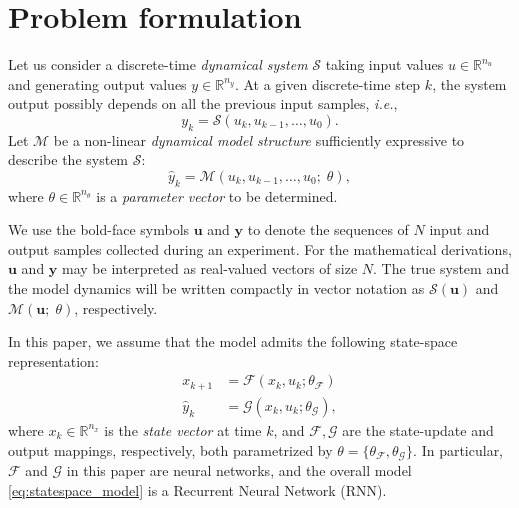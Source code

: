\documentclass{article}
\newcommand{\nsamp}{{N}}
\newcommand{\npar}{{n_\theta}}
\newcommand{\nx}{{n_x}}
\newcommand{\ny}{{n_y}}
\newcommand{\nin}{{n_u}}
\newcommand{\M}{\mathcal{M}}
\newcommand{\F}{\mathcal{F}}
\newcommand{\G}{\mathcal{G}}
\newcommand{\R}{{\mathbb{R}}}
\newcommand{\sys}{{\mathcal{S}}}
\newcommand{\tvec}[1]{{\mathbf{#1}}}
\begin{document}
\section{Problem formulation} 
\label{sec:problem_formulation}
Let us consider a discrete-time \emph{dynamical system} $\sys$ taking input values $u \in \R^\nin$ and generating output values $y \in \R^\ny$. 
At a given discrete-time step $k$, the system output possibly depends on all the previous input samples, \emph{i.e.},
\begin{equation}
    y_{k} = \sys(u_{k}, u_{k-1}, \dots, u_{0}).
\end{equation}
Let $\M$ be a non-linear  \emph{dynamical model structure} sufficiently expressive to describe the system $\sys$:
\begin{equation}
\hat y_{k} = \M(u_{k}, u_{k-1}, \dots, u_{0}; \;\theta),
\end{equation}
where $\theta \in \R^{\npar}$ is a \emph{parameter vector} to be determined. 

We use the bold-face symbols $\tvec{u}$ and $\tvec{y}$ to denote the sequences of $\nsamp$ input and output samples collected during an experiment. 
For the mathematical derivations, $\tvec{u}$ and $\tvec{y}$ may be interpreted as real-valued vectors of size $\nsamp$.
The true system  and the model dynamics will be written compactly in vector notation as $\sys(\tvec{u})$
and $\M(\tvec{u};\; \theta)$, respectively.


In this paper, we assume that the
model admits the following state-space representation:
\begin{subequations}
\label{eq:statespace_model}
\begin{align}
    x_{k+1} &=  \F(x_k, u_k; \theta_{\F}) \label{eq:statespace_model_state} \\
    \hat y_k   &= \G(x_k, u_k; \theta_{\G}) \label{eq:statespace_model_out},
\end{align}
\end{subequations}
where $x_{k} \in \R^{\nx}$ is the \emph{state vector} at time $k$, and $\F, \G$ are the state-update and output mappings, respectively, both parametrized by $\theta=\{\theta_\F,\theta_\G\}$. In particular, $\F$ and $\G$ in this paper are neural networks, and the overall model \eqref{eq:statespace_model} is a Recurrent Neural Network (RNN). 
\end{document}
